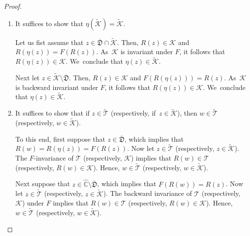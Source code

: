 \documentclass[JEP,XML,SOM,Unicode,NoFloatCountersInSection,published]{cedram}
\theoremstyle{definition}
\theoremstyle{remark}
\newcommand{\C}{\mathbb{C}}
\newcommand{\cT}{\mathcal{T}}
\begin{document}
\skpt
\begin{proof}
\begin{enumerate}
\item
It suffices to show that $\eta(\widetilde{\mathcal{K}})=\widetilde{\mathcal{K}}$.

Let us fist assume that $z\in\overline{\mathfrak{D}}\cap\widetilde{\mathcal{K}}$. Then, $R(z)\in\mathcal{K}$ and $R(\eta(z))=F(R(z))$. As~$\mathcal{K}$ is invariant under $F$, it follows that $R(\eta(z))\in\mathcal{K}$. We~conclude that $\eta(z)\in\widetilde{\mathcal{K}}$.

Next let $z\in\widetilde{\mathcal{K}}\setminus\overline{\mathfrak{D}}$. Then, $R(z)\in\mathcal{K}$ and $F(R(\eta(z)))=R(z)$. As~$\mathcal{K}$ is backward invariant under $F$, it follows that $R(\eta(z))\in\mathcal{K}$. We~conclude that $\eta(z)\in\widetilde{\mathcal{K}}$.

\item
It suffices to show that if $z\in\widetilde{\cT}$ (respectively, if~$z\in\widetilde{\mathcal{K}}$), then $w\in\widetilde{\cT}$ (respectively, $w\in\widetilde{\mathcal{K}}$).

To this end, first suppose that $z\in\overline{\mathfrak{D}}$, which implies that $R(w)=R(\eta(z))=F(R(z))$. Now let $z\in\widetilde{\cT}$ (respectively, $z\in\widetilde{\mathcal{K}}$). The $F$-invariance of $\cT$ (respectively, $\mathcal{K}$) implies that $R(w)\in\cT$ (respectively, $R(w)\in\mathcal{K}$). Hence, $w\in\widetilde{\cT}$ (respectively, $w\in\widetilde{\mathcal{K}}$).

Next suppose that $z\in\widehat{\C}\setminus\overline{\mathfrak{D}}$, which implies that $F(R(w))=R(z)$. Now let $z\in\widetilde{\cT}$ (respectively, $z\in\widetilde{\mathcal{K}}$). The backward invariance of $\cT$ (respectively, $\mathcal{K}$) under $F$ implies that $R(w)\in\cT$ (respectively, $R(w)\in\mathcal{K}$). Hence, $w\in\widetilde{\cT}$ (respectively, $w\in\widetilde{\mathcal{K}}$).\qedhere
\end{enumerate}
\end{proof}
\end{document}
